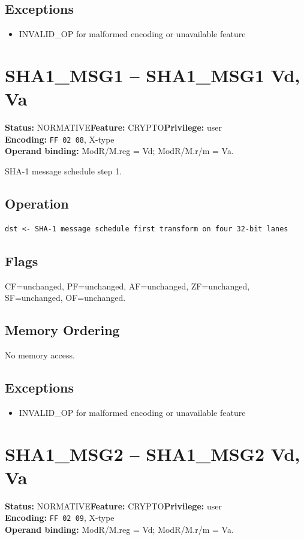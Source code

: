 \documentclass[10pt]{article}
\begin{document}
\subsection*{Exceptions}
\begin{itemize}
\item INVALID\_OP for malformed encoding or unavailable feature
\end{itemize}
\clearpage

\section{SHA1\_MSG1 -- SHA1\_MSG1 Vd, Va}
\textbf{Status:} NORMATIVE\quad \textbf{Feature:} CRYPTO\quad \textbf{Privilege:} user\\
\textbf{Encoding:} \texttt{FF 02 08}, X-type\\
\textbf{Operand binding:} ModR/M.reg = Vd; ModR/M.r/m = Va.

SHA-1 message schedule step 1.

\subsection*{Operation}
\begin{lstlisting}
dst <- SHA-1 message schedule first transform on four 32-bit lanes
\end{lstlisting}
\subsection*{Flags}
CF=unchanged, PF=unchanged, AF=unchanged, ZF=unchanged, SF=unchanged, OF=unchanged.
\subsection*{Memory Ordering}
No memory access.
\subsection*{Exceptions}
\begin{itemize}
\item INVALID\_OP for malformed encoding or unavailable feature
\end{itemize}
\clearpage

\section{SHA1\_MSG2 -- SHA1\_MSG2 Vd, Va}
\textbf{Status:} NORMATIVE\quad \textbf{Feature:} CRYPTO\quad \textbf{Privilege:} user\\
\textbf{Encoding:} \texttt{FF 02 09}, X-type\\
\textbf{Operand binding:} ModR/M.reg = Vd; ModR/M.r/m = Va.
\end{document}
